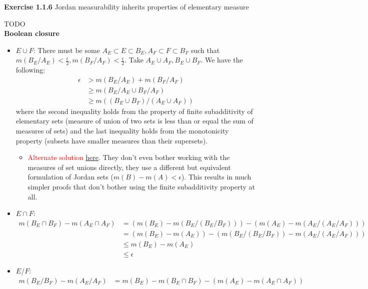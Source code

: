 \documentclass[answers,12pt]{exam}
\begin{document}
\textbf{Exercise 1.1.6} Jordan measurability inherits properties of elementary measure
\begin{solution} TODO\\
\textbf{Boolean closure}
\begin{itemize}
    \item $E \cup F$: There must be some $A_E \subset E \subset B_E, A_F \subset F \subset B_F$ such that $m(B_E/A_E) < \frac{\epsilon}{2}, m(B_F/A_F)<\frac{\epsilon}{2}$. 
    Take $A_E \cup A_F, B_E \cup B_F$.
    We have the following:
    \[
        \begin{aligned}
            \epsilon &> m(B_E/A_E) + m(B_F/A_F)\\
            &\geq m(B_E/A_E \cup B_F/A_F) \\
            &\geq m((B_E \cup B_F)/(A_E \cup A_F))
        \end{aligned}
    \]
    where the second inequality holds from the property of finite subadditivity of elementary sets (measure of union of two sets is less than or equal the sum of measures of sets)
    and the last inequality holds from the monotonicity property (subsets have smaller measures than their supersets).
    \begin{itemize}
        \item \textcolor{red}{Alternate solution} \href{https://math.solverer.com/library/terence_tao/an_introduction_to_measure_theory/exercise_1-1-6}{here}. 
        They don't even bother working with the measures of set unions directly, they use a different but equivalent formulation of Jordan sets ($m(B)-m(A) < \epsilon$). 
        This results in much simpler proofs that don't bother using the finite subadditivity property at all.
    \end{itemize}
    \item $E \cap F$:
    \[
        \begin{aligned}
            m(B_E \cap B_F) - m(A_E \cap A_F) &= 
            (m(B_E)-m(B_E/(B_E/B_F))) - (m(A_E)-m(A_E/(A_E/A_F))) \\
            &= (m(B_E)-m(A_E)) - (m(B_E/(B_E/B_F)) - m(A_E/(A_E/A_F))) \\
            &\leq m(B_E)-m(A_E) \\
            &\leq \epsilon
        \end{aligned}
    \]
    \item $E/F$:
    \[
        \begin{aligned}
            m(B_E/B_F)-m(A_E/A_F) &=
            m(B_E)-m(B_E \cap B_F) - (m(A_E)-m(A_E \cap A_F)) \\

\end{aligned}\]
\end{itemize}
\end{solution}
\end{document}

